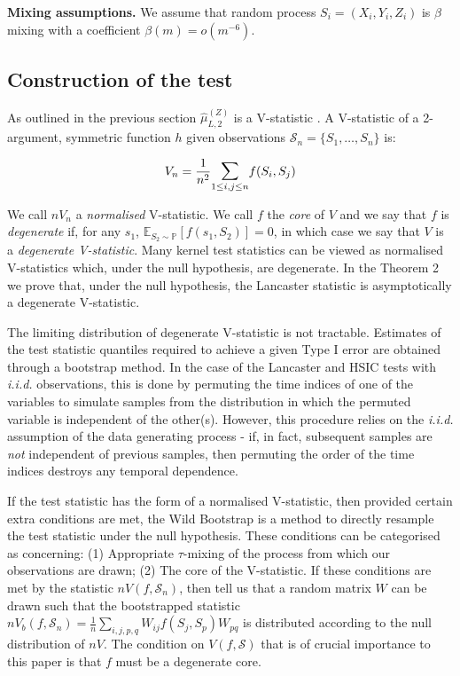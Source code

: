 \documentclass[]{article}
\begin{document}
\textbf{Mixing assumptions.} We assume that random process   $S_i = (X_i,Y_i,Z_i)$ is $\beta$ mixing with a coefficient   $\beta(m)  = o(m^{-6})$. 






\subsection{Construction of the test}
As outlined in the previous section  $\hat \mu^{(Z)}_{L,2}$ is a V-statistic \cite{serfling2009approximation}. A V-statistic   of a 2-argument, symmetric function $h$ given  observations $\mathcal{S}_n = \{S_1,\ldots,S_n\}$  is:

\[ V_n =  \frac{1}{n^2} \mathlarger{\sum}_{1\leq i,j \leq n} f(S_i,S_j)\]


We call $nV_n$ a \emph{normalised} V-statistic. We call $f$ the \emph{core} of $V$ and we say that $f$ is \emph{degenerate} if, for any $s_1$, $\mathbb{E}_{S_2 \sim \mathbb{P}}[f(s_1,S_2)] = 0$, in which case we say that $V$ is a \emph{degenerate V-statistic}. Many kernel test statistics can be viewed as normalised V-statistics which, under the null hypothesis, are degenerate. In the Theorem 2 we prove that, under the null hypothesis, the Lancaster statistic is asymptotically a degenerate V-statistic. 

The limiting distribution of degenerate V-statistic is not tractable.   Estimates of the test statistic quantiles  required to achieve a given Type I error are obtained through a bootstrap  method. In the case of the Lancaster and HSIC tests with \emph{i.i.d.} observations, this is done by permuting the time indices of one of the variables to simulate samples from the distribution in which the permuted variable is independent of the other(s). However, this procedure relies on the \emph{i.i.d.} assumption of the data generating process - if, in fact, subsequent samples are \emph{not} independent of previous samples, then permuting the order of the time indices destroys any temporal dependence. 

If the test statistic has the form of a normalised V-statistic, then provided certain extra conditions are met, the Wild Bootstrap \cite{leucht2013dependent} is a method to directly resample the test statistic under the null hypothesis. These conditions can be categorised as concerning: (1) Appropriate $\tau$-mixing of the process from which our observations are drawn; (2) The core of the V-statistic. If these conditions are met by the statistic $nV(f,\mathcal{S}_n)$, then \cite{leucht2013dependent} tell us that a random matrix $W$ can be drawn such that the bootstrapped statistic $nV_b(f,\mathcal{S}_n)=\frac{1}{n}\sum_{i,j,p,q}W_{ij}f(S_j,S_p)W_{pq}$ is distributed according to the null distribution of $nV$. The condition on $V(f,\mathcal{S})$ that is of crucial importance to this paper is that $f$ must be a degenerate core.
\end{document}
